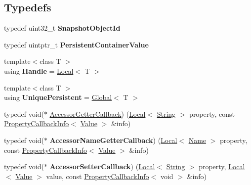 \subsection*{Typedefs}
\begin{DoxyCompactItemize}
\item 
\mbox{\label{namespacev8_acc05be0fdcf26b26fbb410e75a048e63}} 
typedef uint32\+\_\+t {\bfseries Snapshot\+Object\+Id}
\item 
\mbox{\label{namespacev8_af40bc0395e06dd22c3bb1328deb94869}} 
typedef uintptr\+\_\+t {\bfseries Persistent\+Container\+Value}
\item 
\mbox{\label{namespacev8_a9b42f6a6adfdc70e92717a20a2e99ba3}} 
{\footnotesize template$<$class T $>$ }\\using {\bfseries Handle} = \mbox{\hyperlink{classv8_1_1Local}{Local}}$<$ T $>$
\item 
\mbox{\label{namespacev8_a700d7673ecc33741d51e3d22907e8e3f}} 
{\footnotesize template$<$class T $>$ }\\using {\bfseries Unique\+Persistent} = \mbox{\hyperlink{classv8_1_1Global}{Global}}$<$ T $>$
\item 
typedef void($\ast$ \mbox{\hyperlink{namespacev8_a722613c87061708a4f1aa050d095f868}{Accessor\+Getter\+Callback}}) (\mbox{\hyperlink{classv8_1_1Local}{Local}}$<$ \mbox{\hyperlink{classv8_1_1String}{String}} $>$ property, const \mbox{\hyperlink{classv8_1_1PropertyCallbackInfo}{Property\+Callback\+Info}}$<$ \mbox{\hyperlink{classv8_1_1Value}{Value}} $>$ \&info)
\item 
\mbox{\label{namespacev8_a933dad4c36666875af1843bb98df8379}} 
typedef void($\ast$ {\bfseries Accessor\+Name\+Getter\+Callback}) (\mbox{\hyperlink{classv8_1_1Local}{Local}}$<$ \mbox{\hyperlink{classv8_1_1Name}{Name}} $>$ property, const \mbox{\hyperlink{classv8_1_1PropertyCallbackInfo}{Property\+Callback\+Info}}$<$ \mbox{\hyperlink{classv8_1_1Value}{Value}} $>$ \&info)
\item 
\mbox{\label{namespacev8_a926da9728efe528d193a6d36f004777e}} 
typedef void($\ast$ {\bfseries Accessor\+Setter\+Callback}) (\mbox{\hyperlink{classv8_1_1Local}{Local}}$<$ \mbox{\hyperlink{classv8_1_1String}{String}} $>$ property, \mbox{\hyperlink{classv8_1_1Local}{Local}}$<$ \mbox{\hyperlink{classv8_1_1Value}{Value}} $>$ value, const \mbox{\hyperlink{classv8_1_1PropertyCallbackInfo}{Property\+Callback\+Info}}$<$ void $>$ \&info)

\end{DoxyCompactItemize}

